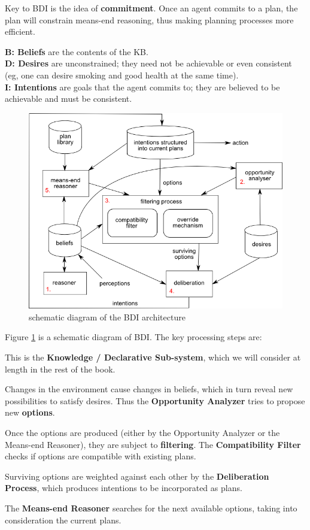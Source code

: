 Key to BDI is the idea of \textbf{commitment}.  Once an agent commits to a plan, the plan will constrain means-end reasoning, thus making planning processes more efficient.

\textbf{B: Beliefs} are the contents of the KB.\\
\textbf{D: Desires} are unconstrained;  they need not be achievable or even consistent (eg, one can desire smoking and good health at the same time).\\
\textbf{I: Intentions} are goals that the agent commits to;  they are believed to be achievable and must be consistent.

\begin{figure}[t]
\centering
\includegraphics[scale=0.7]{BDI-architecture.png}
\caption{schematic diagram of the BDI architecture}
\label{fig:BDI-arch}
\end{figure}

Figure \ref{fig:BDI-arch} is a schematic diagram of BDI.  The key processing steps are:
\begin{compactenum}
\item  This is the \textbf{Knowledge / Declarative Sub-system}, which we will consider at length in the rest of the book.
\item  Changes in the environment cause changes in beliefs, which in turn reveal new possibilities to satisfy desires.  Thus the \textbf{Opportunity Analyzer} tries to propose new \textbf{options}.
\item  Once the options are produced (either by the Opportunity Analyzer or the Means-end Reasoner), they are subject to \textbf{filtering}.  The \textbf{Compatibility Filter} checks if options are compatible with existing plans.
\item  Surviving options are weighted against each other by the \textbf{Deliberation Process}, which produces intentions to be incorporated as plans.
\item  The \textbf{Means-end Reasoner} searches for the next available options, taking into consideration the current plans.
\end{compactenum}

